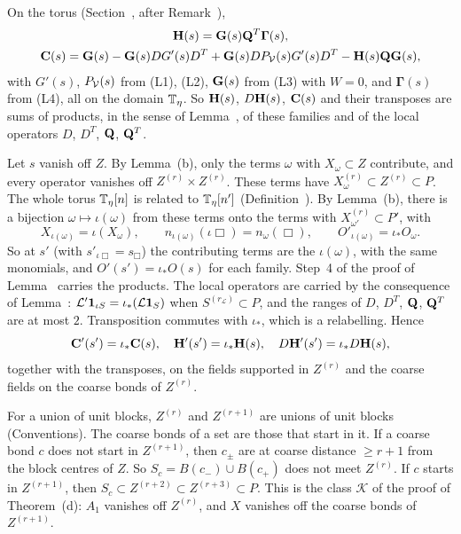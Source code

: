 \begin{step}
On the torus (Section~, after Remark~),
\[
\begin{gathered}
\mathbf H(s)=\mathbf G(s)\mathbf Q^T\boldsymbol\Gamma(s),\\
\mathbf C(s)=\mathbf G(s)-\mathbf G(s)DG'(s)D^T+\mathbf G(s)DP_\mathcal V(s)G'(s)D^T-\mathbf H(s)\mathbf Q\mathbf G(s),
\end{gathered}
\]
with $G'(s)$, $P_\mathcal V(s)$ from (L1), (L2), $\mathbf G(s)$ from (L3) with $W=0$, and $\boldsymbol\Gamma(s)$ from (L4), all on the domain $\mathbb T_\eta$. So $\mathbf H(s)$, $D\mathbf H(s)$, $\mathbf C(s)$ and their transposes are sums of products, in the sense of Lemma~, of these families and of the local operators $D$, $D^T$, $\mathbf Q$, $\mathbf Q^T$.

Let $s$ vanish off $Z$. By Lemma~(b), only the terms $\omega$ with $X_\omega\subset Z$ contribute, and every operator vanishes off $Z^{(r)}\times Z^{(r)}$. These terms have $X_\omega^{(r)}\subset Z^{(r)}\subset P$. The whole torus $\mathbb T_\eta[n]$ is related to $\mathbb T_\eta[n']$ (Definition~). By Lemma~(b), there is a bijection $\omega\mapsto\iota(\omega)$ from these terms onto the terms with $X^{(r)}_{\omega'}\subset P'$, with
\[
X_{\iota(\omega)}=\iota(X_\omega),\qquad n_{\iota(\omega)}(\iota\Box)=n_\omega(\Box),\qquad O'_{\iota(\omega)}=\iota_*O_\omega .
\]
So at $s'$ (with $s'_{\iota\Box}=s_\Box$) the contributing terms are the $\iota(\omega)$, with the same monomials, and $O'(s')=\iota_*O(s)$ for each family. Step~4 of the proof of Lemma~ carries the products. The local operators are carried by the consequence of Lemma~: $\mathcal L'\mathbf 1_{\iota S}=\iota_*(\mathcal L\mathbf 1_S)$ when $S^{(r_{\mathcal L})}\subset P$, and the ranges of $D$, $D^T$, $\mathbf Q$, $\mathbf Q^T$ are at most $2$. Transposition commutes with $\iota_*$, which is a relabelling. Hence
\[
\mathbf C'(s')=\iota_*\mathbf C(s),\quad\mathbf H'(s')=\iota_*\mathbf H(s),\quad D\mathbf H'(s')=\iota_*D\mathbf H(s),
\]
together with the transposes, on the fields supported in $Z^{(r)}$ and the coarse fields on the coarse bonds of $Z^{(r)}$.
\end{step}

\begin{step}
For a union of unit blocks, $Z^{(r)}$ and $Z^{(r+1)}$ are unions of unit blocks (Conventions). The coarse bonds of a set are those that start in it. If a coarse bond $c$ does not start in $Z^{(r+1)}$, then $c_\pm$ are at coarse distance $\ge r+1$ from the block centres of $Z$. So $S_c=B(c_-)\cup B(c_+)$ does not meet $Z^{(r)}$. If $c$ starts in $Z^{(r+1)}$, then $S_c\subset Z^{(r+2)}\subset Z^{(r+3)}\subset P$. This is the class $\mathcal K$ of the proof of Theorem~(d): $A_1$ vanishes off $Z^{(r)}$, and $X$ vanishes off the coarse bonds of $Z^{(r+1)}$.
\end{step}

